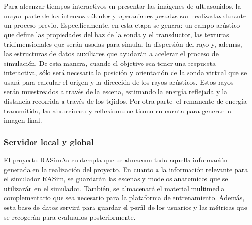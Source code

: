 Para alcanzar tiempos interactivos en presentar las imágenes de ultrasonidos, la mayor parte de los intensos cálculos y operaciones pesadas son realizadas durante un proceso previo. Específicamente, en esta etapa se genera: un campo acústico que define las propiedades del haz de la sonda y el transductor, las texturas tridimensionales que serán usadas para simular la dispersión del rayo y, además, las estructuras de datos auxiliares que ayudarán a acelerar el proceso de simulación.
De esta manera, cuando el objetivo sea tener una respuesta interactiva, sólo será necesaria la posición y orientación de la sonda virtual que se usará para calcular el origen y la dirección de los rayos acústicos. Estos rayos serán muestreados a través de la escena, estimando la energía reflejada y la distancia recorrida a través de los tejidos. Por otra parte, el remanente de energía transmitida, las absorciones y reflexiones se tienen en cuenta para generar la imagen final.











\subsubsection{Servidor local y global}

El proyecto \ac{RASimAs} contempla que se almacene toda aquella información generada en la realización del proyecto. En cuanto a la información relevante para el simulador \ac{RASim}, se guardarán las escenas y modelos anatómicos que se utilizarán en el simulador. También, se almacenará el material multimedia complementario que sea necesario para la plataforma de entrenamiento. Además, esta base de datos servirá para guardar el perfil de los usuarios y las métricas que se recogerán para evaluarlos posteriormente.

